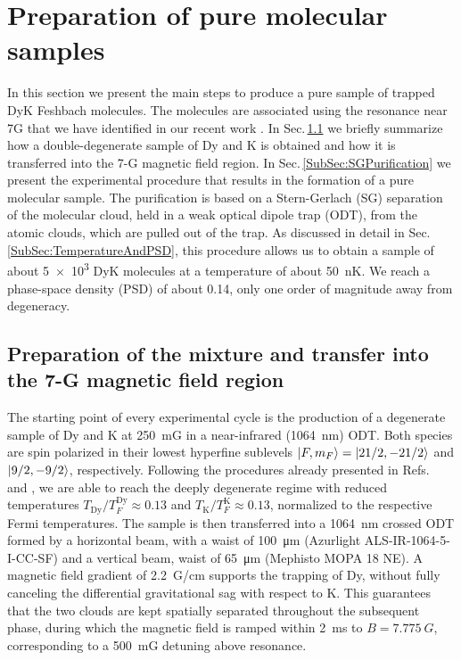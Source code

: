 \section{Preparation of pure molecular samples}\label{Sec:PreparationSection}

In this section we present the main steps to produce a pure sample of trapped DyK Feshbach molecules. The molecules are associated using the resonance near 7G that we have identified in our recent work \cite{Ye2022ool}. In Sec.\,\ref{SubSec:PrepMixture} we briefly summarize how a double-degenerate sample of Dy and K is obtained and how it is transferred into the 7-G magnetic field region. In Sec.\,\ref{SubSec:SGPurification} we present the experimental procedure that results in the formation of a pure molecular sample. The purification is based on a Stern-Gerlach (SG) separation of the molecular cloud, held in a weak optical dipole trap (ODT), from the atomic clouds, which are pulled out of the trap. As discussed in detail in Sec.\,\ref{SubSec:TemperatureAndPSD}, this procedure allows us to obtain a sample of about \SI{5e3}{} DyK molecules at a temperature of about \SI{50}{\nano\kelvin}. We reach a phase-space density (PSD) of about 0.14, only one order of magnitude away from degeneracy.


\subsection{Preparation of the mixture and transfer into the 7-G magnetic field region}\label{SubSec:PrepMixture}

The starting point of every experimental cycle is the production of a degenerate sample of Dy and K at \SI{250}{\milli G} in a near-infrared (\SI{1064}{\nano\meter}) ODT. Both species are spin polarized in their lowest hyperfine sublevels $\ket{F,m_F}=\ket{21/2,-21/2}$ and $\ket{9/2,-9/2}$, respectively. Following the procedures already presented in Refs.\ \cite{Ravensbergen2018poa}  and \cite{Ye2022ool}, we are able to reach the deeply degenerate regime with reduced temperatures $T_{\mathrm{Dy}}/T_F^{\mathrm{Dy}}\approx0.13$ and $T_{\mathrm{K}}/T_F^{\mathrm{K}}\approx0.13$, normalized to the respective Fermi temperatures.
The sample is then transferred into a \SI{1064}{\nano\meter} crossed ODT formed by a horizontal beam, with a waist of \SI{100}{\micro\meter} (Azurlight ALS-IR-1064-5-
I-CC-SF) and a vertical beam, waist of \SI{65}{\micro\meter} (Mephisto MOPA 18 NE). A magnetic field gradient of \SI{2.2}{ G/\centi\meter} supports the trapping of Dy, without fully canceling  the differential gravitational sag with respect to K. This guarantees that the two clouds are kept spatially separated throughout the subsequent phase, during which the magnetic field is ramped within \SI{2}{\milli\second} to $B=\SI{7.775}{ G}$, corresponding to a \SI{500}{\milli G} detuning above resonance.

